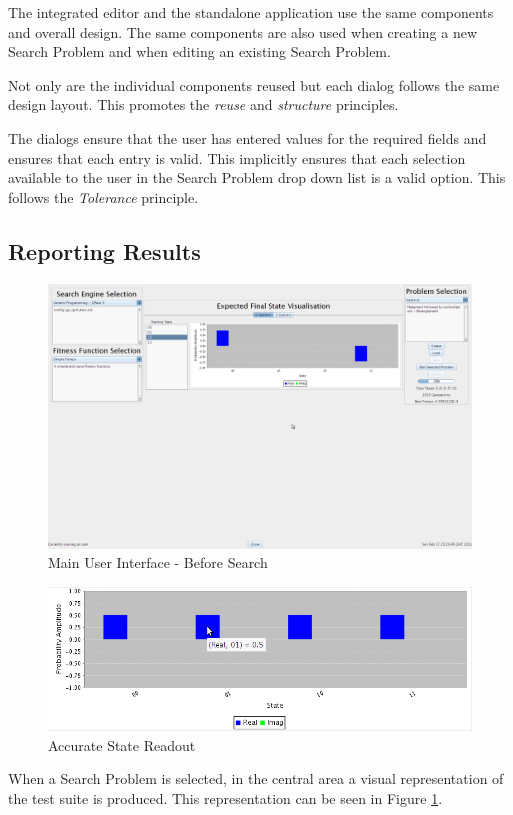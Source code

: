The integrated editor and the standalone application use the same components and overall design.
The same components are also used when creating a new Search Problem and when editing an existing Search Problem.

Not only are the individual components reused but each dialog follows the same design layout.
This promotes the \emph{reuse} and \emph{structure} principles.

The dialogs ensure that the user has entered values for the required fields and ensures that each entry is valid.
This implicitly ensures that each selection available to the user in the Search Problem drop down list is a valid option.
This follows the \emph{Tolerance} principle.

\subsection{Reporting Results}

\begin{figure}
 \includegraphics[width=\textwidth]{GUIDesignProgress.png}
\caption{Main User Interface - Before Search}
\label{fig:MainGUIDesignProg}
\end{figure}
\begin{figure}
 \includegraphics[width=\textwidth]{AccurateReadOutMouseOver.png}
\caption{Accurate State Readout}
\label{fig:AccStateReadOut}
\end{figure}
When a Search Problem is selected, in the central area a visual representation of the test suite is produced.
This representation can be seen in Figure \ref{fig:MainGUIDesignProg}.

